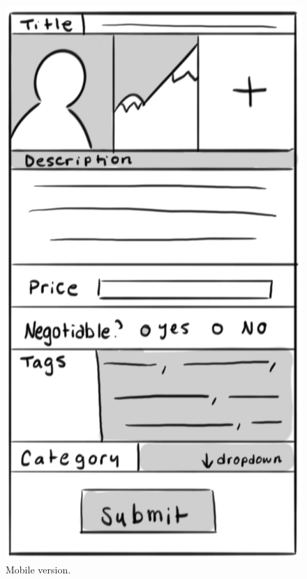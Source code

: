 \documentclass[]{article}
\begin{document}
\begin{enumerate}
			\begin{figure}
			  \includegraphics[width=\linewidth]{./pictures/create_page_mobile.png}
			  \caption{Mobile version.}
			  \label{fig:mobile4}
			\end{figure}
			

\end{enumerate}
\end{document}
